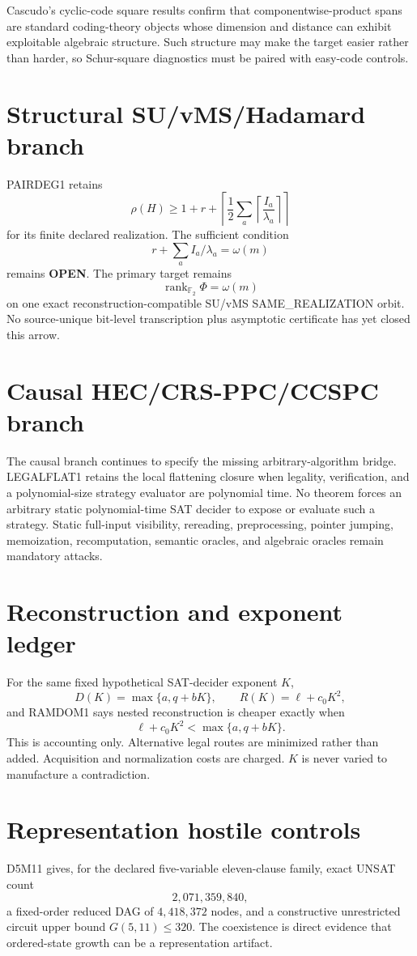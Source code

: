 \documentclass[11pt]{article}
\begin{document}
Cascudo's cyclic-code square results confirm that componentwise-product spans are standard coding-theory objects whose dimension and distance can exhibit exploitable algebraic structure. Such structure may make the target easier rather than harder, so Schur-square diagnostics must be paired with easy-code controls.

\section*{Structural SU/vMS/Hadamard branch}
PAIRDEG1 retains
\[
\rho(H)\ge 1+r+
\left\lceil\frac12\sum_a
\left\lceil\frac{I_a}{\lambda_a}\right\rceil\right\rceil
\]
for its finite declared realization. The sufficient condition
\[
r+\sum_a I_a/\lambda_a=\omega(m)
\]
remains \textbf{OPEN}. The primary target remains
\[
\boxed{\operatorname{rank}_{\mathbb F_2}\Phi=\omega(m)}
\]
on one exact reconstruction-compatible SU/vMS SAME\_REALIZATION orbit. No source-unique bit-level transcription plus asymptotic certificate has yet closed this arrow.

\section*{Causal HEC/CRS-PPC/CCSPC branch}
The causal branch continues to specify the missing arbitrary-algorithm bridge. LEGALFLAT1 retains the local flattening closure when legality, verification, and a polynomial-size strategy evaluator are polynomial time. No theorem forces an arbitrary static polynomial-time SAT decider to expose or evaluate such a strategy. Static full-input visibility, rereading, preprocessing, pointer jumping, memoization, recomputation, semantic oracles, and algebraic oracles remain mandatory attacks.

\section*{Reconstruction and exponent ledger}
For the same fixed hypothetical SAT-decider exponent \(K\),
\[
D(K)=\max\{a,q+bK\},\qquad R(K)=\ell+c_0K^2,
\]
and RAMDOM1 says nested reconstruction is cheaper exactly when
\[
\ell+c_0K^2<\max\{a,q+bK\}.
\]
This is accounting only. Alternative legal routes are minimized rather than added. Acquisition and normalization costs are charged. \(K\) is never varied to manufacture a contradiction.

\section*{Representation hostile controls}
D5M11 gives, for the declared five-variable eleven-clause family, exact UNSAT count
\[
2{,}071{,}359{,}840,
\]
a fixed-order reduced DAG of \(4{,}418{,}372\) nodes, and a constructive unrestricted circuit upper bound \(G(5,11)\le320\). The coexistence is direct evidence that ordered-state growth can be a representation artifact.
\end{document}
